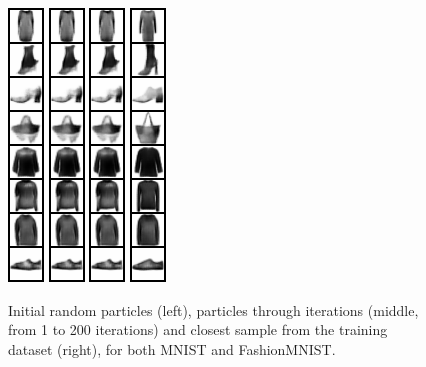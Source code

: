 \begin{figure}[]
{\includegraphics[width=0.06\columnwidth]{figures/FashionMNIST_evolution/train_image_50.png}
\includegraphics[width=0.06\columnwidth]{figures/FashionMNIST_evolution/train_image_100.png}
\includegraphics[width=0.06\columnwidth]{figures/FashionMNIST_evolution/train_image_100.png}
\hspace{0.1cm}
\includegraphics[width=0.06\columnwidth]{figures/FashionMNIST_evolution/train_image_match_200.png}
\label{fig:fashionmnist}
}
\caption{Initial random particles (left), particles through iterations (middle, from 1 to 200 iterations) and closest sample from the training dataset (right), for both MNIST and FashionMNIST.\label{fig:evolution}}
\end{figure}

